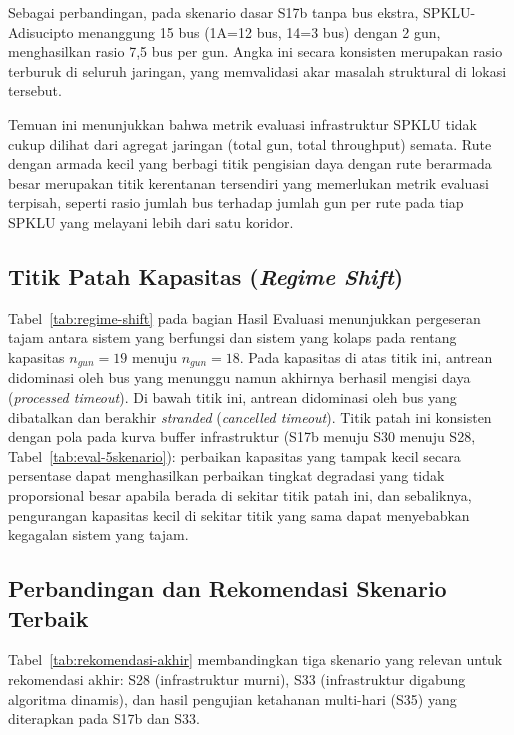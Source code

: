 Sebagai perbandingan, pada skenario dasar S17b tanpa bus ekstra,
SPKLU-Adisucipto menanggung 15 bus (1A=12 bus, 14=3 bus) dengan 2 gun,
menghasilkan rasio 7,5 bus per gun. Angka ini secara konsisten merupakan
rasio terburuk di seluruh jaringan, yang memvalidasi akar masalah struktural
di lokasi tersebut.

Temuan ini menunjukkan bahwa metrik evaluasi infrastruktur SPKLU tidak
cukup dilihat dari agregat jaringan (total gun, total throughput) semata.
Rute dengan armada kecil yang berbagi titik pengisian daya dengan rute
berarmada besar merupakan titik kerentanan tersendiri yang memerlukan
metrik evaluasi terpisah, seperti rasio jumlah bus terhadap jumlah gun
per rute pada tiap SPKLU yang melayani lebih dari satu koridor.

\subsection{Titik Patah Kapasitas (\textit{Regime Shift})}

Tabel~\ref{tab:regime-shift} pada bagian Hasil Evaluasi menunjukkan
pergeseran tajam antara sistem yang berfungsi dan sistem yang kolaps
pada rentang kapasitas $n_{gun}=19$ menuju $n_{gun}=18$. Pada kapasitas
di atas titik ini, antrean didominasi oleh bus yang menunggu namun
akhirnya berhasil mengisi daya (\textit{processed timeout}). Di bawah
titik ini, antrean didominasi oleh bus yang dibatalkan dan berakhir
\textit{stranded} (\textit{cancelled timeout}). Titik patah ini
konsisten dengan pola pada kurva buffer infrastruktur (S17b menuju S30
menuju S28, Tabel~\ref{tab:eval-5skenario}): perbaikan kapasitas yang
tampak kecil secara persentase dapat menghasilkan perbaikan tingkat
degradasi yang tidak proporsional besar apabila berada di sekitar titik
patah ini, dan sebaliknya, pengurangan kapasitas kecil di sekitar titik
yang sama dapat menyebabkan kegagalan sistem yang tajam.

\subsection{Perbandingan dan Rekomendasi Skenario Terbaik}

Tabel~\ref{tab:rekomendasi-akhir} membandingkan tiga skenario yang
relevan untuk rekomendasi akhir: S28 (infrastruktur murni), S33
(infrastruktur digabung algoritma dinamis), dan hasil pengujian
ketahanan multi-hari (S35) yang diterapkan pada S17b dan S33.

